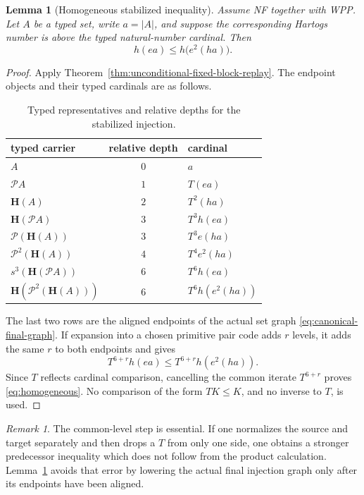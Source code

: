 \documentclass[11pt]{article}
\newtheorem{lemma}[theorem]{Lemma}
\numberwithin{equation}{section}
\theoremstyle{definition}
\theoremstyle{remark}
\newtheorem{remark}[theorem]{Remark}
\newcommand{\Pow}{\mathcal P}
\begin{document}
\begin{lemma}[Homogeneous stabilized inequality]\label{lem:homogeneous}
Assume NF together with WPP.  Let $A$ be a typed set, write $a=|A|$, and
suppose the corresponding Hartogs number is above the typed natural-number
cardinal.  Then
\begin{equation}
 h(ea)\leq h\bigl(e^2(ha)\bigr).
 \label{eq:homogeneous}
\end{equation}
\end{lemma}

\begin{proof}
Apply Theorem~\ref{thm:unconditional-fixed-block-replay}.  The endpoint
objects and their typed cardinals are as follows.
\begin{table}[ht]
\centering
\caption{Typed representatives and relative depths for the stabilized injection.}
\label{tab:ledger}
\begin{tabular}{@{}lcl@{}}
\toprule
typed carrier & relative depth & cardinal \\
\midrule
$A$ & $0$ & $a$ \\
$\Pow A$ & $1$ & $T(ea)$ \\
$\mathbf H(A)$ & $2$ & $T^2(ha)$ \\
$\mathbf H(\Pow A)$ & $3$ & $T^3h(ea)$ \\
$\Pow(\mathbf H(A))$ & $3$ & $T^3e(ha)$ \\
$\Pow^2(\mathbf H(A))$ & $4$ & $T^4e^2(ha)$ \\
$s^3(\mathbf H(\Pow A))$ & $6$ & $T^6h(ea)$ \\
$\mathbf H(\Pow^2(\mathbf H(A)))$ & $6$ & $T^6h(e^2(ha))$ \\
\bottomrule
\end{tabular}
\end{table}

The last two rows are the aligned endpoints of the actual set graph
\eqref{eq:canonical-final-graph}.  If expansion into a chosen primitive
pair code adds $r$ levels, it adds the same $r$ to both endpoints and gives
\[
 T^{6+r}h(ea)\leq T^{6+r}h(e^2(ha)).
\]
Since $T$ reflects cardinal comparison, cancelling the common iterate
$T^{6+r}$ proves \eqref{eq:homogeneous}.  No comparison of the form
$TK\leq K$, and no inverse to $T$, is used.
\end{proof}

\begin{remark}
The common-level step is essential.  If one normalizes the source and
target separately and then drops a $T$ from only one side, one obtains a
stronger predecessor inequality which does not follow from the product
calculation.  Lemma~\ref{lem:homogeneous} avoids that error by lowering the
actual final injection graph only after its endpoints have been aligned.
\end{remark}
\end{document}

